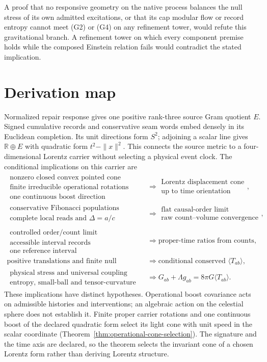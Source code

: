 \documentclass[11pt]{article}
\begin{document}
A proof that no responsive geometry on the native process balances the null
stress of its own admitted excitations, or that its cap modular flow or record
entropy cannot meet (G2) or (G4) on any refinement tower, would refute this
gravitational branch. A refinement tower on which every component premise
holds while the composed Einstein relation fails would contradict the stated
implication.

\section*{Derivation map}

Normalized repair response gives one positive rank-three source Gram
quotient $E$. Signed cumulative records and conservative seam words embed
densely in its Euclidean completion. Its unit directions form $S^2$;
adjoining a scalar line gives $\mathbb R\oplus E$ with quadratic form
$t^2-\|x\|^2$. This connects the source metric to a four-dimensional
Lorentz carrier without selecting a physical event clock. The conditional
implications on this carrier are
\[
\begin{aligned}
\substack{\text{nonzero closed convex pointed cone}\\
\text{finite irreducible operational rotations}\\
\text{one continuous boost direction}}
&\Longrightarrow
\substack{\text{Lorentz displacement cone}\\
\text{up to time orientation}},\\[1mm]
\substack{\text{conservative Fibonacci populations}\\
\text{complete local reads and }\Delta=a/c}
&\Longrightarrow
\substack{\text{flat causal-order limit}\\
\text{raw count--volume convergence}},\\[1mm]
\substack{\text{controlled order/count limit}\\
\text{accessible interval records}\\
\text{one reference interval}}
&\Longrightarrow
\text{proper-time ratios from counts},\\[1mm]
\text{positive translations and finite null tomography}
&\Longrightarrow
\text{conditional conserved }\langle T_{ab}\rangle,\\[1mm]
\substack{\text{physical stress and universal coupling}\\
\text{entropy, small-ball and tensor-curvature limits}}
&\Longrightarrow
G_{ab}+\Lambda g_{ab}=8\pi G\langle T_{ab}\rangle .
\end{aligned}
\]
These implications have distinct hypotheses. Operational boost covariance
acts on admissible histories and interventions; an algebraic action on the
celestial sphere does not establish it. Finite proper carrier rotations and
one continuous boost of the declared quadratic form select its light cone with
unit speed in the scalar coordinate
(Theorem~\ref{thm:operational-cone-selection}). The signature and the time
axis are declared, so the theorem selects the invariant cone of a chosen
Lorentz form rather than deriving Lorentz structure.
\end{document}
